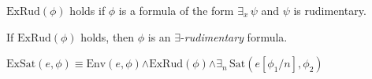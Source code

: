 \documentclass[10pt]{amsart}
\newcommand{\mexists}{\boldsymbol{\exists}}
\newcommand{\mand}{\boldsymbol{\wedge}}
\begin{document}
\begin{definition}
  $\mathrm{ExRud}(\phi)$ holds if $\phi$ is a formula of the form $\exists_x\,\psi$ and $\psi$ is rudimentary.

  If $\mathrm{ExRud}(\phi)$ holds, then $\phi$ is an $\mexists$-\textit{rudimentary} formula.
\end{definition}


\begin{definition}
  $\mathrm{ExSat}(e,\phi) \equiv \mathrm{Env}(e,\phi) \mand \mathrm{ExRud}(\phi) \mand \mexists_n\,\mathrm{Sat}(e[\phi_1/n],\phi_2)$
\end{definition}



\small


\end{document}
